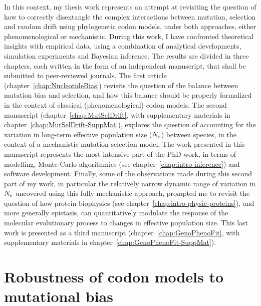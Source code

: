 In this context, my thesis work represents an attempt at revisiting the question of how to correctly disentangle the complex interactions between mutation, selection and random drift using phylogenetic codon models, under both approaches, either phenomenological or mechanistic.
During this work, I have confronted theoretical insights with empirical data, using a combination of analytical developments, simulation experiments and Bayesian inference.
The results are divided in three chapters, each written in the form of an independent manuscript, that shall be submitted to peer-reviewed journals.
The first article (chapter~\ref{chap:NucleotideBias}) revisits the question of the balance between mutation bias and selection, and how this balance should be properly formalized in the context of classical (phenomenological) codon models.
The second manuscript (chapter~\ref{chap:MutSelDrift}, with supplementary materials in chapter~\ref{chap:MutSelDrift-SuppMat}), explores the question of accounting for the variation in long-term effective population size ($N_{\text{e}}$) between species, in the context of a mechanistic mutation-selection model.
The work presented in this manuscript represents the most intensive part of the PhD work, in terms of modelling, Monte Carlo algorithmics (see chapter~\ref{chap:intro-inference}) and software development.
Finally, some of the observations made during this second part of my work, in particular the relatively narrow dynamic range of variation in $N_{\text{e}}$ uncovered using this fully mechanistic approach, prompted me to revisit the question of how protein biophysics (see chapter~\ref{chap:intro-physic-proteins}), and more generally epistasis, can quantitatively modulate the response of the molecular evolutionary process to changes in effective population size.
This last work is presented as a third manuscript (chapter~\ref{chap:GenoPhenoFit}, with supplementary materials in chapter~\ref{chap:GenoPhenoFit-SuppMat}).


\section{Robustness of codon models to mutational bias}
\label{sec-goals:NucleotideBias}

